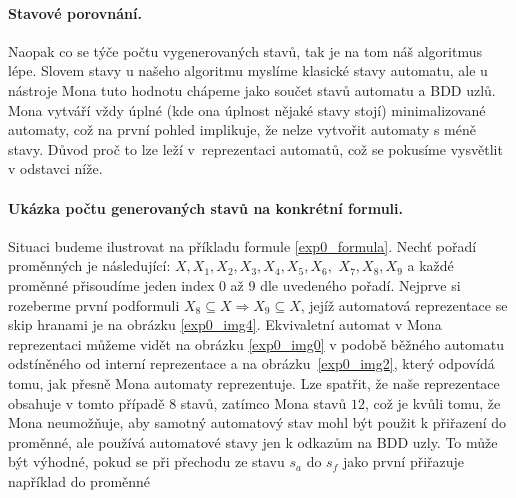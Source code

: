 \paragraph{Stavové porovnání.} Naopak co se týče počtu vygenerovaných stavů, tak je na tom náš algoritmus lépe. Slovem stavy u našeho algoritmu myslíme klasické stavy automatu, ale u nástroje Mona tuto hodnotu chápeme jako součet stavů automatu a BDD uzlů. Mona vytváří vždy úplné (kde ona úplnost nějaké stavy stojí) minimalizované automaty, což na první pohled implikuje, že nelze vytvořit automaty s méně stavy. Důvod proč to lze leží v~reprezentaci automatů, což se pokusíme vysvětlit v odstavci níže.

\paragraph{Ukázka počtu generovaných stavů na konkrétní formuli.} Situaci budeme ilustrovat na příkladu formule \ref{exp0_formula}. Nechť pořadí proměnných je následující: $X, X_1, X_2, X_3, X_4, X_5, X_6,$ $ X_7, X_8, X_9$ a každé proměnné přisoudíme jeden index 0 až 9 dle uvedeného pořadí. Nejprve si rozeberme první podformuli $X_8 \subseteq X \Rightarrow X_9 \subseteq X$, jejíž automatová reprezentace se skip hranami je na obrázku \ref{exp0_img4}. Ekvivaletní automat v Mona reprezentaci můžeme vidět na obrázku \ref{exp0_img0} v podobě běžného automatu odstíněného od interní reprezentace a na obrázku~\ref{exp0_img2}, který odpovídá tomu, jak přesně Mona automaty reprezentuje. Lze spatřit, že naše reprezentace obsahuje v tomto případě $8$ stavů, zatímco Mona stavů $12$, což je kvůli tomu, že Mona neumožňuje, aby samotný automatový stav mohl být použit k přiřazení do proměnné, ale používá automatové stavy jen k odkazům na BDD uzly. To může být výhodné, pokud se při přechodu ze stavu $s_a$ do $s_f$ jako první přiřazuje například do proměnné

